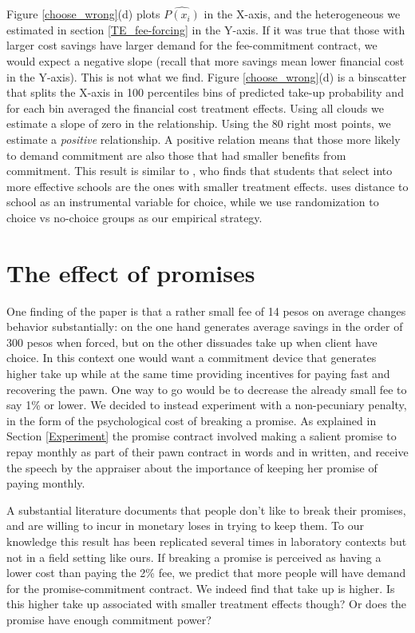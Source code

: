 \documentclass[11pt]{article}
\begin{document}
Figure \ref{choose_wrong}(d) plots $\widehat{P(x_i)}$ in the X-axis, and the heterogeneous we estimated in section \ref{TE_fee-forcing} in the Y-axis. If it was true that those with larger cost savings have larger demand for the fee-commitment contract, we would expect a negative slope (recall that more savings mean lower financial cost in the Y-axis). This is not what we find. Figure \ref{choose_wrong}(d) is a binscatter that splits the X-axis in 100 percentiles bins of predicted take-up probability and for each bin averaged the financial cost treatment effects. Using all clouds we estimate a slope of zero in the relationship. Using the 80 right most points, we estimate a \textit{positive} relationship. A positive relation means that those more likely to demand commitment are also those that had smaller benefits from commitment. This result is similar to \cite{Walters}, who finds that students that select into more effective schools are the ones with smaller treatment effects. \cite{Walters} uses distance to school as an instrumental variable for choice, while we use randomization to choice vs no-choice groups as our empirical strategy.

    
\section{The effect of promises} \label{promises}

One finding of the paper is that a rather small fee of 14 pesos on average changes behavior substantially: on the one hand generates average savings in the order of 300 pesos when forced, but on the other dissuades take up  when client have choice. In this context one would want a commitment device that generates higher take up while at the same time providing incentives for paying fast and recovering the pawn. One way to go would be to decrease the already small fee to say 1\% or lower. We decided to instead experiment with a non-pecuniary penalty, in the form of the psychological cost of breaking a promise. As explained in Section \ref{Experiment} the promise contract involved making a salient promise to repay monthly as part of their pawn contract in words and in written, and receive the speech by the appraiser about the importance of keeping her promise of paying monthly.

A substantial literature documents that people don't like to break their promises, and are willing to incur in monetary loses in trying to keep them. To our knowledge this result has been replicated several times in laboratory contexts but not in a field setting like ours. If breaking a promise is perceived as having a lower cost than paying the 2\% fee, we predict that more people will have demand for the promise-commitment contract. We indeed find that take up is higher. Is this higher take up associated with smaller treatment effects though? Or does the promise have enough commitment power?  
\end{document}
